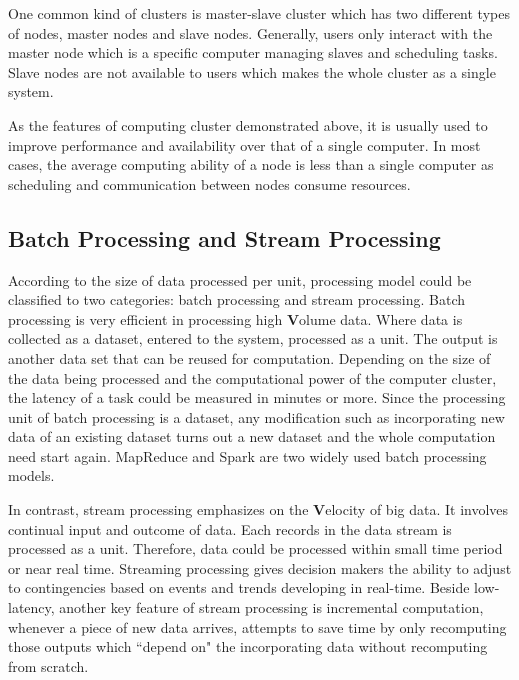 One common kind of clusters is master-slave cluster which has two different types of nodes, master nodes and slave nodes. Generally,  users only interact with the master node which is a specific computer managing slaves and scheduling tasks. Slave nodes are not available to users which makes the whole cluster as a single system.

As the features of computing cluster demonstrated above, it is usually used to improve performance and availability over that of a single computer. In most cases, the average computing ability of a node is less than a single computer as scheduling and communication between nodes consume resources.

\subsection{Batch Processing and Stream Processing}
According to the size of data processed per unit, processing model could be classified to two categories: batch processing and stream processing. Batch processing is very efficient in processing high \textbf{V}olume data. Where data is collected as a dataset, entered to the system, processed as a unit.  The output is another data set that can be reused for computation. Depending on the size of the data being processed and the computational power of the computer cluster, the latency of a task could be measured in minutes or more. Since the processing unit of batch processing is a dataset, any modification such as incorporating new data of an existing dataset turns out a new dataset and the whole computation need start again. MapReduce and Spark are two widely used batch processing models.
 
In contrast, stream processing emphasizes on the \textbf{V}elocity of big data. It involves continual input and outcome of data. Each records in the data stream is processed as a unit. Therefore, data could be processed within small time period or near real time. Streaming processing gives decision makers the ability to adjust to contingencies based on events and trends developing in real-time. Beside low-latency, another key feature of stream processing is incremental computation, whenever a piece of new data arrives, attempts to save time by only recomputing those outputs which ``depend on" the incorporating data without recomputing from scratch.

